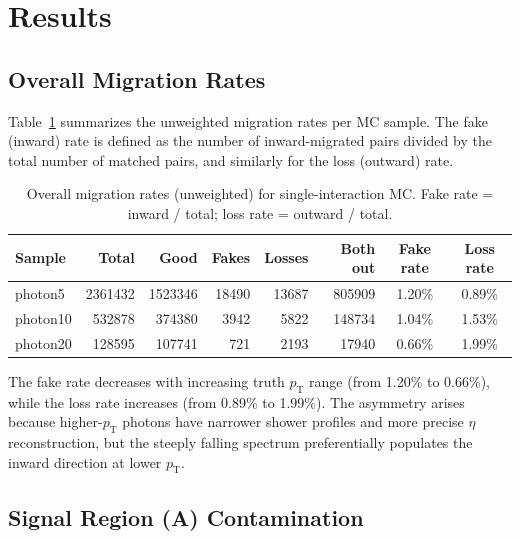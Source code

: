 \documentclass[11pt,letterpaper]{article}
\providecommand{\num}[1]{#1}  %
\newcommand{\pT}{\ensuremath{p_{\text{T}}}}
\begin{document}
\section{Results}
\label{sec:results}

\subsection{Overall Migration Rates}
\label{sec:overall}

Table~\ref{tab:overall} summarizes the unweighted migration rates per MC sample.
The fake (inward) rate is defined as the number of inward-migrated pairs divided
by the total number of matched pairs, and similarly for the loss (outward) rate.

\begin{table}[htbp]
\centering
\caption{Overall migration rates (unweighted) for single-interaction MC. Fake
  rate = inward / total; loss rate = outward / total.}
\label{tab:overall}
\begin{tabular}{lrrrrrcc}
\toprule
Sample & Total & Good & Fakes & Losses & Both out & Fake rate & Loss rate \\
\midrule
photon5  & \num{2361432} & \num{1523346} & \num{18490} & \num{13687} & \num{805909} & 1.20\% & 0.89\% \\
photon10 & \num{532878}  & \num{374380}  & \num{3942}  & \num{5822}  & \num{148734} & 1.04\% & 1.53\% \\
photon20 & \num{128595}  & \num{107741}  & \num{721}   & \num{2193}  & \num{17940}  & 0.66\% & 1.99\% \\
\bottomrule
\end{tabular}
\end{table}

The fake rate decreases with increasing truth $\pT$ range (from 1.20\% to
0.66\%), while the loss rate increases (from 0.89\% to 1.99\%). The asymmetry
arises because higher-$\pT$ photons have narrower shower profiles and more
precise $\eta$ reconstruction, but the steeply falling spectrum preferentially
populates the inward direction at lower $\pT$.

\subsection{Signal Region (A) Contamination}
\label{sec:signal_contamination}
\end{document}
